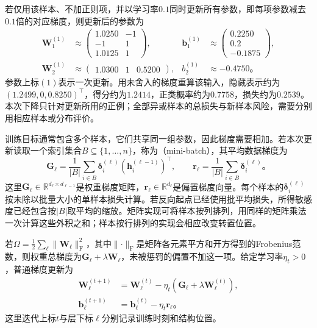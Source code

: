 \begin{example}[一次前向与反向计算]
  若仅用该样本、不加正则项，并以学习率$0.1$同时更新所有参数，即每项参数减去$0.1$倍的对应梯度，则更新后的参数为
  \[
    \begin{aligned}
      \bm{W}_1^{(1)}&\approx
        \begin{pmatrix}1.0250&-1\\-1&1\\1.0125&1\end{pmatrix},
      &\bm{b}_1^{(1)}&\approx
        \begin{pmatrix}0.2250\\0.2\\-0.1875\end{pmatrix},\\
      \bm{W}_2^{(1)}&\approx\begin{pmatrix}1.0300&1&0.5200\end{pmatrix},
      &b_2^{(1)}&\approx-0.4750\text{。}
    \end{aligned}
  \]
  参数上标$(1)$表示一次更新。用未舍入的梯度重算该输入，隐藏表示约为$(1.2499,0,0.8250)^{\top}$，得分约为$1.2414$，正类概率约为$0.7758$，损失约为$0.2539$。本次下降只针对更新所用的正例；全部异或样本的总损失与新样本风险，需要分别用相应样本或分布评价。
\end{example}

训练目标通常包含多个样本，它们共享同一组参数，因此梯度需要相加。若本次更新读取一个索引集合$B\subseteq\{1,\ldots,n\}$，称为（mini-batch），其平均数据梯度为
\begin{equation}
  \bm{G}_\ell=
  \frac1{|B|}\sum_{i\in B}
  \bm{\delta}_i^{(\ell)}(\bm{h}_i^{(\ell-1)})^{\top},
  \qquad
  \bm{r}_\ell=
  \frac1{|B|}\sum_{i\in B}\bm{\delta}_i^{(\ell)}\text{。}
  \label{eq:ffn-minibatch-gradients}
\end{equation}
这里$\bm{G}_\ell\in\mathbb R^{d_\ell\times d_{\ell-1}}$是权重梯度矩阵，$\bm{r}_\ell\in\mathbb R^{d_\ell}$是偏置梯度向量。每个样本的$\bm{\delta}_i^{(\ell)}$按未除以批量大小的单样本损失计算。若反向起点已经使用批平均损失，所得敏感度已经包含按$|B|$取平均的缩放。矩阵实现可将样本按列排列，用同样的矩阵乘法一次计算这些外积之和；样本按行排列的实现会相应改变转置位置。

若$\Omega=\frac12\sum_\ell\lVert\bm{W}_\ell\rVert_{\mathrm{F}}^2$，其中$\lVert\cdot\rVert_{\mathrm{F}}$是矩阵各元素平方和开方得到的Frobenius范数，则权重总梯度为$\bm{G}_\ell+\lambda\bm{W}_\ell$，未被惩罚的偏置不加这一项。给定学习率$\eta_t>0$，普通梯度更新为
\begin{equation}
  \begin{aligned}
    \bm{W}_\ell^{(t+1)}
      &=\bm{W}_\ell^{(t)}-\eta_t(\bm{G}_\ell+\lambda\bm{W}_\ell^{(t)}),\\
    \bm{b}_\ell^{(t+1)}&=\bm{b}_\ell^{(t)}-\eta_t\bm{r}_\ell\text{。}
  \end{aligned}
  \label{eq:ffn-gradient-update}
\end{equation}
这里迭代上标$t$与层下标$\ell$分别记录训练时刻和结构位置。

